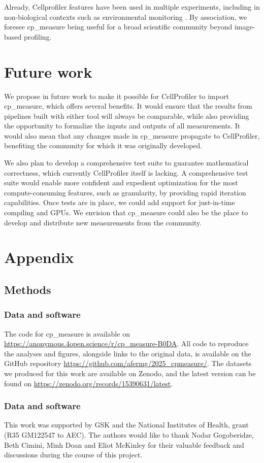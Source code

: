\documentclass{article}
\begin{document}
Already, Cellprofiler features have been used in multiple experiments, including in non-biological contexts such as environmental monitoring \citep{ideharaExploringNileRed2025}. By association, we foresee cp\_measure being useful for a broad scientific community beyond image-based profiling.
\section{Future work}
\label{sec:org5cdbb12}
We propose in future work to make it possible for CellProfiler to import cp\_measure, which offers several benefits. It would ensure that the results from pipelines built with either tool will always be comparable, while also providing the opportunity to formalize the inputs and outputs of all measurements. It would also mean that any changes made in cp\_measure propagate to CellProfiler, benefiting the community for which it was originally developed.

We also plan to develop a comprehensive test suite to guarantee mathematical correctness, which currently CellProfiler itself is lacking. A comprehensive test suite would enable more confident and expedient optimization for the most compute-consuming features, such as granularity, by providing rapid iteration capabilities. Once tests are in place, we could add support for just-in-time compiling and GPUs. We envision that cp\_measure could also be the place to develop and distribute new measurements from the community. 



\section{Appendix}
\label{sec:orgdd18dd8}
\subsection{Methods}
\label{sec:orgb3e9382}
\subsubsection{Data and software}
\label{sec:orgbda0ae2}
The code for cp\_measure is available on \url{https://anonymous.4open.science/r/cp\_measure-B0DA}. All code to reproduce the analyses and figures, alongside links to the original data, is available on the GitHub repository \url{https://github.com/afermg/2025\_cpmeasure/}. The datasets we produced for this work are available on Zenodo, and the latest version can be found on \url{https://zenodo.org/records/15390631/latest}.
\subsubsection{Data and software}
\label{sec:acknowledgements}

This work was supported by GSK and the National Institutes of Health, grant (R35 GM122547 to AEC). The authors would like to thank Nodar Gogoberidze, Beth Cimini, Minh Doan and Eliot McKinley for their valuable feedback and discussions during the course of this project.
\end{document}
